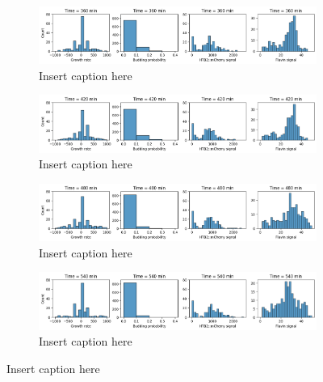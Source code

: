 \begin{figure}
  \centering
  \begin{subfigure}[htpb]{0.9\textwidth}
   \centering
   \includegraphics[width=\textwidth]{19972_distribs_0360}
   \caption{
     Insert caption here
   }
   \label{fig:biology-starvation-distribs-0360}
  \end{subfigure}

  \begin{subfigure}[htpb]{0.9\textwidth}
   \centering
   \includegraphics[width=\textwidth]{19972_distribs_0420}
   \caption{
     Insert caption here
   }
   \label{fig:biology-starvation-distribs-0420}
  \end{subfigure}

  \begin{subfigure}[htpb]{0.9\textwidth}
   \centering
   \includegraphics[width=\textwidth]{19972_distribs_0480}
   \caption{
     Insert caption here
   }
   \label{fig:biology-starvation-distribs-0480}
  \end{subfigure}

  \begin{subfigure}[htpb]{0.9\textwidth}
   \centering
   \includegraphics[width=\textwidth]{19972_distribs_0540}
   \caption{
     Insert caption here
   }
   \label{fig:biology-starvation-distribs-0540}
  \end{subfigure}


\end{figure}
